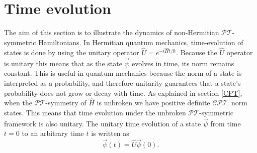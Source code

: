 \documentclass[12pt, a4paper]{report}
\newcommand\PT{\(\mathcal{PT}\)}
\newcommand\CPT{\(\mathcal{CPT}\)}
\begin{document}
\chapter{Time evolution}\label{Tev}
The aim of this section is to illustrate the dynamics of non-Hermitian \PT-symmetric Hamiltonians. In Hermitian quantum mechanics, time-evolution of states is done by using the unitary operator $\hat{U} = e^{-i\hat{H}t/\hbar}$. Because the $\hat{U}$ operator is unitary this means that as the state $\vec{\psi}$ evolves in time, its norm remains constant. This is useful in quantum mechanics because the norm of a state is interpreted as a probability, and therefore unitarity guarantees that a state's probability does not grow or decay with time. As explained in section \ref{CPT}, when the \PT-symmetry of $\hat{H}$ is unbroken we have positive definite \CPT norm states. This means that time evolution under the unbroken \PT-symmetric framework is also unitary\cite{Jones-Smith}\cite{ComplexExtension}\cite{Mostafazadeh2}. 
The unitary time evolution of a state $\vec{\psi}$ from time $t = 0$ to an arbitrary time $t$ is written as
\begin{equation}\label{eq:1.13}
\vec{\psi}(t) = \hat{U} \vec{\psi}(0).
\end{equation}




\end{document}
